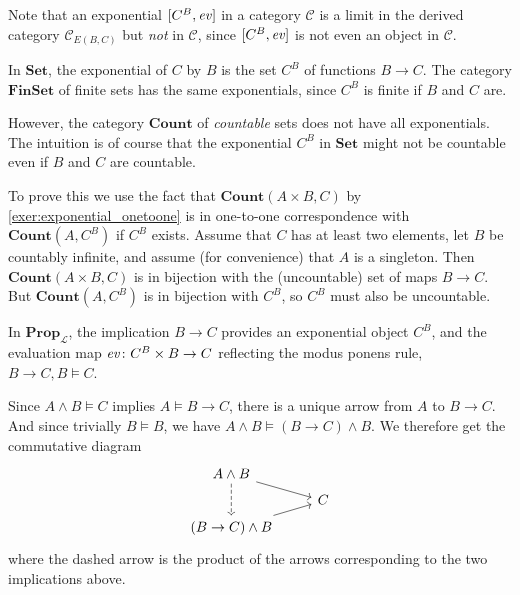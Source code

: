 \documentclass[article, a4paper, 11pt, oneside]{memoir}
\numberwithin{equation}{chapter}
\newcommand{\calL}{\mathcal{L}}
\newcommand{\cat}[1]{\mathcal{#1}}
\newcommand{\ncat}[1]{\mathbf{#1}} %
\newcommand{\catSet}{\ncat{Set}}
\newcommand{\catFinSet}{\ncat{FinSet}}
\newcommand{\catProp}{\ncat{Prop}}
\newcommand{\catCount}{\ncat{Count}}
\newcommand{\catC}{\cat{C}}
\begin{document}
Note that an exponential $[C^B, \mathit{ev}]$ in a category $\catC$ is a limit in the derived category $\catC_{E(B,C)}$ but \emph{not} in $\catC$, since $[C^B, \mathit{ev}]$ is not even an object in $\catC$.


\begin{examplebreak}
    \begin{enumexample}
        \item In $\catSet$, the exponential of $C$ by $B$ is the set $C^B$ of functions $B \to C$. The category $\catFinSet$ of finite sets has the same exponentials, since $C^B$ is finite if $B$ and $C$ are.
        
        \item However, the category $\catCount$ of \emph{countable} sets does not have all exponentials. The intuition is of course that the exponential $C^B$ in $\catSet$ might not be countable even if $B$ and $C$ are countable.
        
        To prove this we use the fact that $\catCount(A \times B, C)$ by \cref{exer:exponential_onetoone} is in one-to-one correspondence with $\catCount(A, C^B)$ if $C^B$ exists. Assume that $C$ has at least two elements, let $B$ be countably infinite, and assume (for convenience) that $A$ is a singleton. Then $\catCount(A \times B, C)$ is in bijection with the (uncountable) set of maps $B \to C$. But $\catCount(A, C^B)$ is in bijection with $C^B$, so $C^B$ must also be uncountable.

        \item In $\catProp_\calL$, the implication $B \to C$ provides an exponential object $C^B$, and the evaluation map $\mathit{ev} \colon C^B \times B \to C$ reflecting the modus ponens rule, $B \to C, B \vDash C$.
        
        Since $A \land B \vDash C$ implies $A \vDash B \to C$, there is a unique arrow from $A$ to $B \to C$. And since trivially $B \vDash B$, we have $A \land B \vDash (B \to C) \land B$. We therefore get the commutative diagram
        \begin{equation*}
            \begin{tikzcd}[row sep=tiny]
                A \land B
                    \ar[dd, dashed]
                    \ar[dr]
                \\
                & C
                \\
                (B \to C) \land B
                    \ar[ur]
            \end{tikzcd}
        \end{equation*}
        where the dashed arrow is the product of the arrows corresponding to the two implications above.
    \end{enumexample}
\end{examplebreak}
\end{document}
